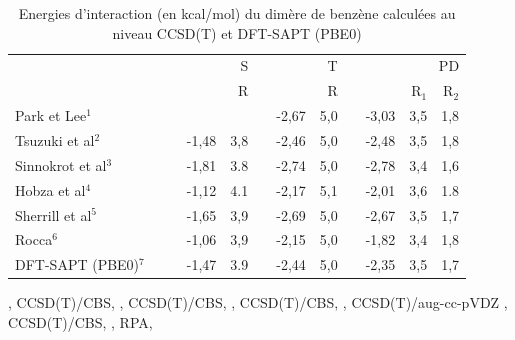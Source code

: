 		\begin{table}[H]
			\caption{Energies d'interaction (en kcal/mol) du dimère de benzène calculées au niveau CCSD(T) et DFT-SAPT (PBE0)} \label{table-benprot}
			\begin{center}
				\begin{tabular}{l c r r r c r r c r r r}
					\toprule
					& & & \multicolumn{2}{p{2cm}}{\centering S}  &	& \multicolumn{2}{p{2cm}}{\centering
						T}& &\multicolumn{3}{p{3cm}}{\centering PD}\\
					\cline{4-12}
					& & & & R & &  &  R & & & R$_{1}$ & R$_{2}$ \\
					\midrule
					Park et Lee$^{1}$ & & & &  & &-2,67& 5,0 & &-3,03 & 3,5 & 1,8\\
					Tsuzuki et al$^{2}$ & & & -1,48& 3,8 &  &-2,46& 5,0&  & -2,48 & 3,5& 1,8\\
					Sinnokrot et al$^{3}$ & & & -1,81 & 3.8 & &-2,74& 5,0&  & -2,78 & 3,4 & 1,6\\
					Hobza et al$^{4}$ & & &-1,12 & 4.1 &  &-2,17& 5,1& & -2,01 & 3,6 & 1.8\\
					Sherrill et al$^{5}$& &  & -1,65 & 3,9 & & -2,69& 5,0 & & -2,67 & 3,5 & 1,7 \\
					Rocca$^{6}$ & & & -1,06& 3,9& & -2,15& 5,0 & & -1,82 & 3,4 & 1,8\\ 
					DFT-SAPT (PBE0)$^{7}$ & & & -1,47 & 3.9 &  &-2,44 &5,0& & -2,35& 3,5 &1,7\\
					\bottomrule
				\end{tabular}
			\end{center}
			\centering
			, CCSD(T)/CBS,
			, CCSD(T)/CBS,
			, CCSD(T)/CBS,
			, CCSD(T)/aug-cc-pVDZ
			, CCSD(T)/CBS,
			, RPA, 
			
			\label{benzene}
		\end{table}
		
